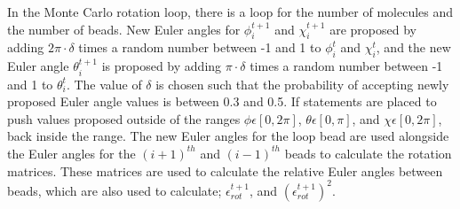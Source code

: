 \documentclass[11pt]{article}
\begin{document}
In the Monte Carlo rotation loop, there is a loop for the number of molecules and the number of beads. New Euler angles for \begin{math} \phi^{t+1}_i \end{math} and \begin{math} \chi^{t+1}_i \end{math} are proposed by adding \begin{math} 2 \pi \cdot \delta \end{math} times a random number between -1 and 1 to \begin{math} \phi^{t}_i \end{math} and \begin{math} \chi^{t}_i \end{math}, and the new Euler angle \begin{math} \theta^{t+1}_i \end{math} is proposed by adding \begin{math} \pi \cdot \delta \end{math} times a random number between -1 and 1 to \begin{math} \theta^{t}_i \end{math}. The value of \begin{math} \delta \end{math} is chosen such that the probability of accepting newly proposed Euler angle values is between 0.3 and 0.5. If statements are placed to push values proposed outside of the ranges \begin{math} \phi \epsilon [0 , 2 \pi]  \end{math}, \begin{math} \theta \epsilon [0 , \pi] \end{math}, and \begin{math} \chi \epsilon [0 , 2 \pi] \end{math}, back inside the range. The new Euler angles for the loop bead are used alongside the Euler angles for the \begin{math} (i+1)^{th} \end{math} and \begin{math} (i-1)^{th} \end{math} beads to calculate the rotation matrices. These matrices are  used to calculate the relative Euler angles between beads, which are also used to calculate; \begin{math} \epsilon_{rot}^{t+1} \end{math}, and \begin{math} ( \epsilon_{rot}^{t+1} )^2 \end{math}. 
\end{document}
